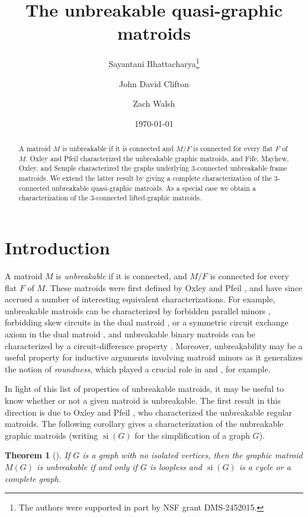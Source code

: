 \documentclass[12pt]{article}
\title{The unbreakable quasi-graphic matroids}
\author[1]{Sayantani Bhattacharya\thanks{The authors were supported in part by NSF grant DMS-2452015.}}
\author[1]{John David Clifton\samethanks}
\author[1]{Zach Walsh\samethanks}
\affil[1]{\small Auburn University, Department of Mathematics and Statistics, Auburn, AL, U.S.A.}
\date{\today}
\newtheorem{theorem}{Theorem}[section]
\theoremstyle{definition}
\theoremstyle{plain} %
\DeclareMathOperator{\si}{si}
\begin{document}
\maketitle


\begin{abstract} 
A matroid $M$ is unbreakable if it is connected and $M/F$ is connected for every flat $F$ of $M$.
Oxley and Pfeil characterized the unbreakable graphic matroids, and Fife, Mayhew, Oxley, and Semple characterized the graphs underlying $3$-connected unbreakable frame matroids.
We extend the latter result by giving a complete characterization of the $3$-connected unbreakable quasi-graphic matroids.
As a special case we obtain a characterization of the $3$-connected lifted-graphic matroids.
\end{abstract}


\section{Introduction}\label{sec: introduction}

A matroid $M$ is \emph{unbreakable} if it is connected, and $M/F$ is connected for every flat $F$ of $M$.
These matroids were first defined by Oxley and Pfeil \cite{Oxley-Pfeil2022}, and have since accrued a number of interesting equivalent characterizations.
For example, unbreakable matroids can be characterized by forbidden parallel minors \cite[Theorem 1.1]{Oxley-Pfeil2022}, forbidding skew circuits in the dual matroid \cite[Theorem 1.1]{Oxley-Pfeil2022}, or a symmetric circuit exchange axiom in the dual matroid \cite[Theorem 1.1]{Cho-Oxley-Wang-2026}, and unbreakable binary matroids can be characterized by a circuit-difference property \cite[Lemma 1.2]{Drummond-Fife-Grace-Oxley-2020}.
Moreover, unbreakability may be a useful property for inductive arguments involving matroid minors as it generalizes the notion of \emph{roundness}, which played a crucial role in \cite{Geelen-Nelson-2010} and \cite{Nelson-2013}, for example.


In light of this list of properties of unbreakable matroids, it may be useful to know whether or not a given matroid is unbreakable.
The first result in this direction is due to Oxley and Pfeil \cite{Oxley-Pfeil2022}, who characterized the unbreakable regular matroids. 
The following corollary gives a  characterization of the unbreakable graphic matroids (writing $\si(G)$ for the simplification of a graph $G$).

\begin{theorem}[{\cite[Theorem 1.2]{Oxley-Pfeil2022}}] \label{thm: the unbreakable graphic matroids}
If $G$ is a graph with no isolated vertices, then the graphic matroid $M(G)$ is unbreakable if and only if $G$ is loopless and $\si(G)$ is a cycle or a complete graph.
\end{theorem}
\end{document}
